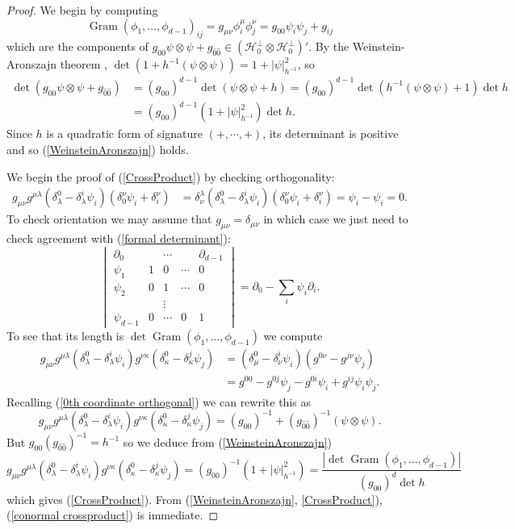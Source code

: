 \documentclass[reqno,12pt,letterpaper]{amsart}
\DeclareMathOperator{\Gram}{Gram}
\newcommand{\Hilb}{\mathcal H}
\theoremstyle{definition}
\numberwithin{equation}{section}
\begin{document}
\begin{proof}
We begin by computing
$$\Gram(\phi_1, \dots, \phi_{d - 1})_{ij} = g_{\mu \nu} \phi_i^\mu \phi_j^\nu = g_{00} \psi_i \psi_j + g_{ij}$$
which are the components of $g_{00}\psi \otimes \psi + g_{\hat 0 \hat 0} \in (\Hilb_0^\perp \otimes \Hilb_0^\perp)'$.
By the Weinstein-Aronszajn theorem \cite{Tao13}, $\det(1 + h^{-1}(\psi \otimes \psi)) = 1 + |\psi|_{h^{-1}}^2$, so
\begin{align*}
\det(g_{00}\psi \otimes \psi + g_{\hat 0 \hat 0})
&= (g_{00})^{d - 1} \det(\psi \otimes \psi + h) = (g_{00})^{d - 1} \det(h^{-1}(\psi \otimes \psi) + 1) \det h \\
&= (g_{00})^{d - 1} (1 + |\psi|_{h^{-1}}^2) \det h.
\end{align*}
Since $h$ is a quadratic form of signature $(+, \cdots, +)$, its determinant is positive and so (\ref{WeinsteinAronszajn}) holds.

We begin the proof of (\ref{CrossProduct}) by checking orthogonality:
\begin{align*}
g_{\mu\nu} g^{\mu \lambda} (\delta^0_\lambda - \delta^i_\lambda \psi_i)(\delta^\nu_0 \psi_i + \delta^\nu_i)
&= \delta^\lambda_\nu (\delta^0_\lambda - \delta^i_\lambda \psi_i)(\delta^\nu_0 \psi_i + \delta_i^\nu)
= \psi_i - \psi_i = 0.
\end{align*}
To check orientation we may assume that $g_{\mu\nu} = \delta_{\mu\nu}$ in which case we just need to check agreement with (\ref{formal determinant}):
$$\begin{vmatrix} \partial_0 && \cdots && \partial_{d - 1} \\
\psi_1 & 1 & 0 & \cdots & 0 \\
\psi_2 & 0 & 1 & \cdots & 0\\
&& \vdots \\
\psi_{d - 1} & 0 & \cdots & 0 & 1
\end{vmatrix} = \partial_0 - \sum_i \psi_i \partial_i.$$
To see that its length is $\det \Gram(\phi_1, \dots, \phi_{d - 1})$ we compute
\begin{align*}
g_{\mu \nu} g^{\mu \lambda}(\delta^0_\lambda - \delta^i_\lambda \psi_i) g^{\nu \kappa}(\delta_\kappa^0 - \delta_\kappa^j \psi_j)
&= (\delta_\mu^0 - \delta_\nu^i \psi_i)(g^{0 \nu} - g^{j \nu} \psi_j)\\
&= g^{00} - g^{0j} \psi_j - g^{0i} \psi_i + g^{ij} \psi_i \psi_j.
\end{align*}
Recalling (\ref{0th coordinate orthogonal}) we can rewrite this as
$$g_{\mu \nu} g^{\mu \lambda}(\delta^0_\lambda - \delta^i_\lambda \psi_i) g^{\nu \kappa}(\delta_\kappa^0 - \delta_\kappa^j \psi_j) = (g_{00})^{-1} + (g_{\hat 0 \hat 0})^{-1}(\psi \otimes \psi).$$
But $g_{00} (g_{\hat 0 \hat 0})^{-1} = h^{-1}$ so we deduce from (\ref{WeinsteinAronszajn})
$$g_{\mu \nu} g^{\mu \lambda}(\delta^0_\lambda - \delta^i_\lambda \psi_i) g^{\nu \kappa}(\delta_\kappa^0 - \delta_\kappa^j \psi_j) = (g_{00})^{-1} (1 + |\psi|_{h^{-1}}^2)
= \frac{|\det \Gram(\phi_1, \dots, \phi_{d - 1})|}{(g_{00})^d \det h}$$
which gives (\ref{CrossProduct}).
From (\ref{WeinsteinAronszajn}, \ref{CrossProduct}), (\ref{conormal crossproduct}) is immediate.
\end{proof}
\end{document}
